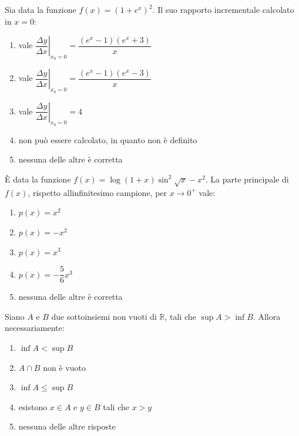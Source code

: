 \begin{quiz}
Sia data la funzione $f(x)=(1+e^x)^2$. Il suo rapporto incrementale calcolato in $x=0$:
\begin{enumerate}
\item vale $\left.\dfrac{\Delta y}{\Delta x}\right|_{x_0=0}=\dfrac{(e^x-1)(e^x+3)}{x}$
\item vale $\left.\dfrac{\Delta y}{\Delta x}\right|_{x_0=0}=\dfrac{(e^x-1)(e^x-3)}{x}$
\item vale $\left.\dfrac{\Delta y}{\Delta x}\right|_{x_0=0}=4$
\item non pu\`o essere calcolato, in quanto non \`e definito
\item nessuna delle altre \`e corretta
\end{enumerate}
\end{quiz}

\begin{quiz}
\`E data la funzione $f(x)=\log(1+x)\sin^2\sqrt{x}-x^2$. La parte principale di $f(x)$, rispetto all\textquotesingle infinitesimo campione, per $x\to0^+$ vale:
\begin{enumerate}
\item $p(x)=x^2$
\item $p(x)=-x^2$
\item $p(x)=x^3$
\item $p(x)=-\dfrac56x^3$
\item nessuna delle altre \`e corretta
\end{enumerate}
\end{quiz}

\begin{quiz}
Siano $A$ e $B$ due sottoinsiemi non vuoti di $\mathbb R$, tali che $\sup A>\inf B$. Allora necessariamente:
\begin{enumerate}
\item $\inf A<\sup B$
\item $A\cap B$ non \`e vuoto
\item $\inf A\le\sup B$
\item esistono $x\in A$ e $y\in B$ tali che $x>y$
\item nessuna delle altre risposte
\end{enumerate}
\end{quiz}

